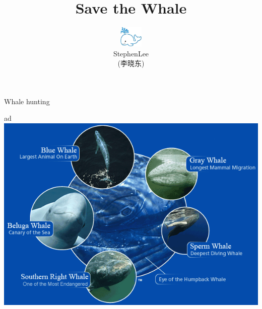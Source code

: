 \documentclass{beamer}
\begin{document}
\begin{CJK}{UTF8}{gkai}
\title{Save the Whale}
\author[XiaodongLi]{\includegraphics[height=1cm,width=2cm]{logo}\\StephenLee\\(李晓东)}
\renewcommand{\today}{ April 24, 2012}

\begin{frame}
\maketitle
\end{frame}


\begin{frame}{Whale hunting}
\begin{block}{ad}
  \includegraphics{endange}
\end{block}
\end{frame}

\end{CJK}
\end{document}
